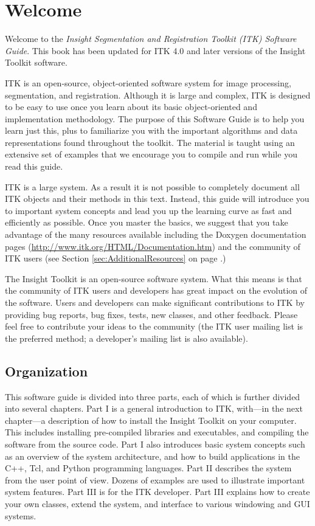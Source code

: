 \chapter{Welcome}
\label{chapter:Introduction}

Welcome to the \emph{Insight Segmentation and Registration Toolkit (ITK)
Software Guide}. This book has been updated for ITK 4.0 and later versions of
the Insight Toolkit software.

ITK is an open-source, object-oriented software system for image processing,
segmentation, and registration.  Although it is large and complex, ITK is
designed to be easy to use once you learn about its basic object-oriented and
implementation methodology. The purpose of this Software Guide is
to help you learn just this, plus to familiarize you with the important
algorithms and data representations found throughout the toolkit. The material
is taught using an extensive set of examples that we encourage you to compile
and run while you read this guide.

ITK is a large system. As a result it is not possible to completely document
all ITK objects and their methods in this text. Instead, this guide will
introduce you to important system concepts and lead you up the learning curve
as fast and efficiently as possible. Once you master the basics, we suggest
that you take advantage of the many resources available including the Doxygen
documentation pages (\url{http://www.itk.org/HTML/Documentation.htm}) and
the community of ITK users (see Section \ref{sec:AdditionalResources} on page 
\pageref{sec:AdditionalResources}.)

The Insight Toolkit is an open-source software system. What this means
is that the community of ITK users and developers has great impact on the
evolution of the software. Users and developers can make significant
contributions to ITK by providing bug reports, bug fixes, tests, new classes,
and other feedback. Please feel free to contribute your ideas to the
community (the ITK user mailing list is the preferred method; a developer's 
mailing list is also available).

\section{Organization}
\label{sec:Organization}

This software guide is divided into three parts, each of which is further
divided into several chapters. Part I is a general introduction to ITK,
with---in the next chapter---a description of how to install the Insight
Toolkit on your computer. This includes installing pre-compiled libraries and
executables, and compiling the software from the source code. Part I also
introduces basic system concepts such as an overview of the system
architecture, and how to build applications in the C++, Tcl, and Python programming
languages. Part II describes the system from the user point of view. Dozens
of examples are used to illustrate important system features. Part III is for
the ITK developer. Part III explains how to create your own classes, extend
the system, and interface to various windowing and GUI systems.

